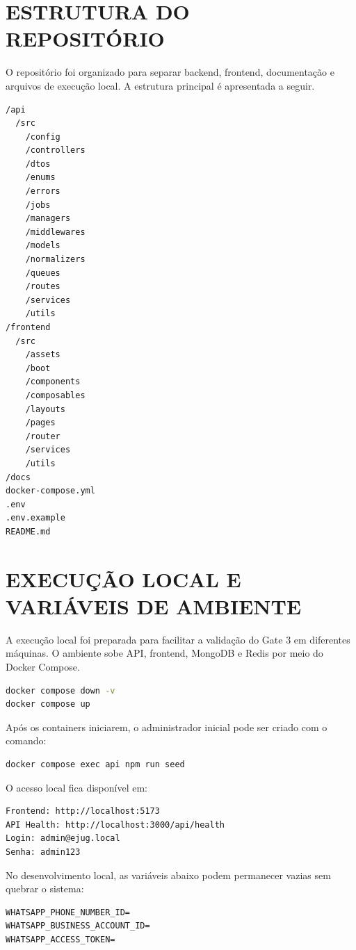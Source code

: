 \documentclass[12pt,letterpaper,oneside]{report}
\begin{document}
\section{ESTRUTURA DO REPOSITÓRIO}

O repositório foi organizado para separar backend, frontend, documentação e arquivos de execução local. A estrutura principal é apresentada a seguir.

\begin{lstlisting}
/api
  /src
    /config
    /controllers
    /dtos
    /enums
    /errors
    /jobs
    /managers
    /middlewares
    /models
    /normalizers
    /queues
    /routes
    /services
    /utils
/frontend
  /src
    /assets
    /boot
    /components
    /composables
    /layouts
    /pages
    /router
    /services
    /utils
/docs
docker-compose.yml
.env
.env.example
README.md
\end{lstlisting}

\section{EXECUÇÃO LOCAL E VARIÁVEIS DE AMBIENTE}

A execução local foi preparada para facilitar a validação do Gate 3 em diferentes máquinas. O ambiente sobe API, frontend, MongoDB e Redis por meio do Docker Compose.

\begin{lstlisting}[language=bash]
docker compose down -v
docker compose up
\end{lstlisting}

Após os containers iniciarem, o administrador inicial pode ser criado com o comando:

\begin{lstlisting}[language=bash]
docker compose exec api npm run seed
\end{lstlisting}

O acesso local fica disponível em:

\begin{lstlisting}
Frontend: http://localhost:5173
API Health: http://localhost:3000/api/health
Login: admin@ejug.local
Senha: admin123
\end{lstlisting}

No desenvolvimento local, as variáveis abaixo podem permanecer vazias sem quebrar o sistema:

\begin{lstlisting}
WHATSAPP_PHONE_NUMBER_ID=
WHATSAPP_BUSINESS_ACCOUNT_ID=
WHATSAPP_ACCESS_TOKEN=
\end{lstlisting}
\end{document}
